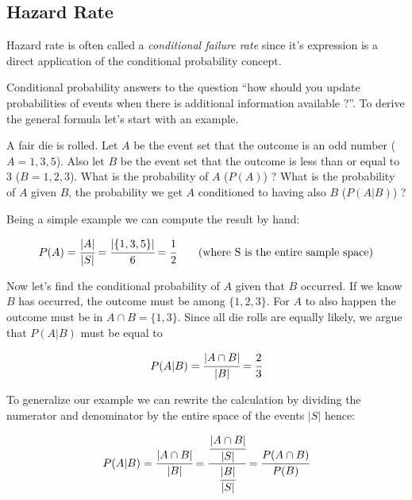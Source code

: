 \subsection{Hazard Rate}\label{hazard-rate}

Hazard rate is often called a \emph{conditional failure rate} since it's
expression is a direct application of the conditional probability
concept.

Conditional probability answers to the question ``how should you update
probabilities of events when there is additional information available
?''. To derive the general formula let's start with an example.

A fair die is rolled. Let \(A\) be the event set that the outcome is an odd
number (\(A={1,3,5}\)). Also let \(B\) be the event set that the outcome is
less than or equal to \(3\) (\(B={1,2,3}\)). What is the probability of
\(A\) (\(P(A)\)) ? What is the probability of \(A\) given \(B\), the probability we get $A$ conditioned to having also $B$
(\(P(A|B)\)) ?

Being a simple example we can compute the result by hand:

\begin{equation}
P(A) = \cfrac{|A|}{|S|} = \cfrac{|\{1,3,5\}|}{6} = \cfrac{1}{2}\qquad\textrm{(where S is the entire sample space)}\end{equation}

Now let's find the conditional probability of \(A\) given that \(B\)
occurred. If we know \(B\) has occurred, the outcome must be among
\(\{1,2,3\}\). For \(A\) to also happen the outcome must be in
\(A\cap B = \{1,3\}\). Since all die rolls are equally likely, we argue
that \(P(A|B)\) must be equal to

\begin{equation}P(A|B) = \cfrac{|A\cap B|}{|B|} = \cfrac{2}{3}\end{equation}

To generalize our example we can rewrite the calculation by dividing the
numerator and denominator by the entire space of the events \(|S|\)
hence:

\begin{equation}P(A|B) = \cfrac{|A\cap B|}{|B|} = \cfrac{\cfrac{|A\cap B|}{|S|}}{\cfrac{|B|}{|S|}} = \cfrac{P(A\cap B)}{P(B)}\end{equation}


